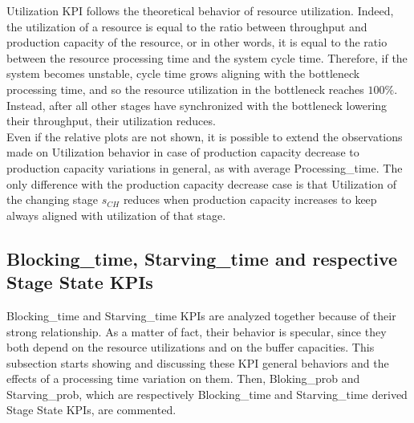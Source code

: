 Utilization KPI follows the theoretical behavior of resource utilization. Indeed, the utilization of a resource is equal to the ratio between throughput and production capacity of the resource, or in other words, it is equal to the ratio between the resource processing time and the system cycle time. Therefore, if the system becomes unstable, cycle time grows aligning with the bottleneck processing time, and so the resource utilization in the bottleneck reaches $100\%$. Instead, after all other stages have synchronized with the bottleneck lowering their throughput, their utilization reduces.\\
Even if the relative plots are not shown, it is possible to extend the observations made on Utilization behavior in case of production capacity decrease to production capacity variations in general, as with average Processing\_time. The only difference with the production capacity decrease case is that Utilization of the changing stage $s_{CH}$ reduces when production capacity increases to keep always aligned with utilization of that stage.
\newpage
\subsection{Blocking\_time, Starving\_time and respective Stage State KPIs}
\label{Blocking time, Starving time and respective Stage State KPIs - Processing time variation}
Blocking\_time and Starving\_time KPIs are analyzed together because of their strong relationship. As a matter of fact, their behavior is specular, since they both depend on the resource utilizations and on the buffer capacities. This subsection starts showing and discussing these KPI general behaviors and the effects of a processing time variation on them. Then, Bloking\_prob and Starving\_prob, which are respectively Blocking\_time and Starving\_time derived Stage State KPIs, are commented. 
